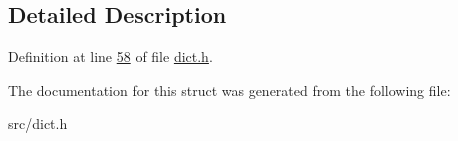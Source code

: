 \subsection{Detailed Description}


Definition at line \hyperlink{dict_8h_source_l00058}{58} of file \hyperlink{dict_8h_source}{dict.\+h}.



The documentation for this struct was generated from the following file\+:\begin{DoxyCompactItemize}
\item 
src/dict.\+h\end{DoxyCompactItemize}
